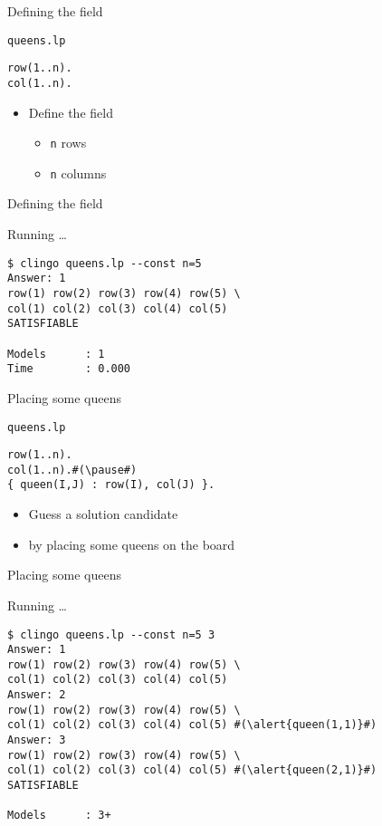 \begin{frame}[fragile]{Defining the field}
  \pause
  \begin{block}{\texttt{queens.lp}}
\begin{lstlisting}
row(1..n).
col(1..n).
\end{lstlisting}
  \end{block}
  \begin{itemize}
  \item [\itarrow] Define the field
    \begin{itemize}\normalsize
    \item \texttt{n} rows
    \item \texttt{n} columns
    \end{itemize}
  \end{itemize}
\end{frame}
\begin{frame}[fragile]{Defining the field}
  \begin{block}{Running \ldots}
\begin{lstlisting}
$ clingo queens.lp --const n=5
Answer: 1
row(1) row(2) row(3) row(4) row(5) \
col(1) col(2) col(3) col(4) col(5)
SATISFIABLE

Models      : 1
Time        : 0.000
\end{lstlisting}
  \end{block}
\end{frame}
\begin{frame}[fragile]{Placing some queens}
  \begin{block}{\texttt{queens.lp}}
\begin{lstlisting}
row(1..n).
col(1..n).#(\pause#)
{ queen(I,J) : row(I), col(J) }.
\end{lstlisting}
  \end{block}
  \begin{itemize}
  \item [\itarrow] Guess a solution candidate
  \item [] by placing some queens on the board
  \end{itemize}
\end{frame}
\begin{frame}[fragile,shrink]{Placing some queens}
  \begin{block}{Running \ldots}
\begin{lstlisting}
$ clingo queens.lp --const n=5 3
Answer: 1
row(1) row(2) row(3) row(4) row(5) \
col(1) col(2) col(3) col(4) col(5)
Answer: 2
row(1) row(2) row(3) row(4) row(5) \
col(1) col(2) col(3) col(4) col(5) #(\alert{queen(1,1)}#)
Answer: 3
row(1) row(2) row(3) row(4) row(5) \
col(1) col(2) col(3) col(4) col(5) #(\alert{queen(2,1)}#)
SATISFIABLE

Models      : 3+
\end{lstlisting}
  \end{block}
\end{frame}
